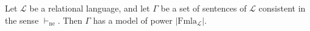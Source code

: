 Let $\mathcal{L}$ be a relational language, and let $\Gamma$ be a set of sentences of $\mathcal{L}$ consistent in the sense $\vdash_{\text{ne}}$. Then $\Gamma$ has a model of power $|\text{Fmla}_{\mathcal{L}}|$.
